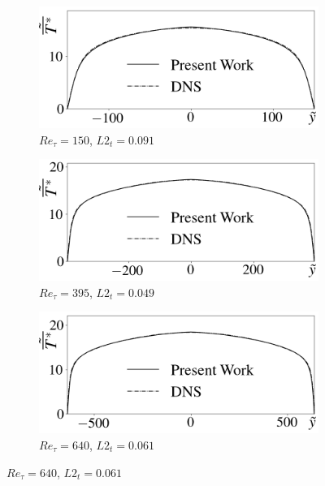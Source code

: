 \documentclass[10pt]{article} %
\begin{document}
\begin{figure}[!h]
	\centering
	\begin{subfigure}[t]{0.5\textwidth}
		\centering
		\includegraphics[angle=0, scale=0.24]{fotos_formatacao_final/Temperature_150_071_Genetic2temperature}
		\caption{$Re_\tau = 150$, $L2_t = 0.091$}
	\end{subfigure}
	\begin{subfigure}[t]{0.45\textwidth}
		\centering
		\includegraphics[angle=0, scale=0.24]{fotos_formatacao_final/Temperature_395_071_Genetic2temperature}
		\caption{$Re_\tau = 395$, $L2_t = 0.049$}
	\end{subfigure}
	\begin{subfigure}[t]{0.5\textwidth}
		\centering
		\includegraphics[angle=0, scale=0.24]{fotos_formatacao_final/Temperature_640_071_Genetic2temperature}
		\caption{$Re_\tau = 640$, $L2_t = 0.061$}

\end{subfigure}
\end{figure}
\end{document}

